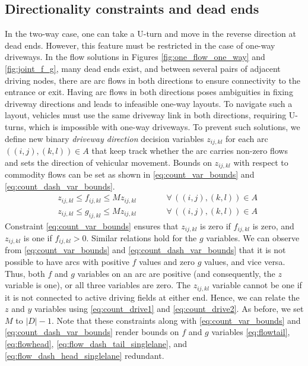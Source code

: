 \documentclass[10pt]{article}
\newcommand{\flowvar}[4]{f_{#1#2,#3#4}}
\newcommand{\flowvardash}[4]{g_{#1#2,#3#4}}
\newcommand{\countvar}[4]{z_{#1#2,#3#4}}
\newcommand{\validdriveset}{D}
\newcommand{\gridarcset}{A}
\theoremstyle{definition}
\begin{document}
\subsection{Directionality constraints and dead ends}
\label{sec:dead_end}
In the two-way case, one can take a U-turn and move in the reverse direction at dead ends. However, this feature must be restricted in the case of one-way driveways. In the flow solutions in Figures \ref{fig:one_flow_one_way} and \ref{fig:joint_f_g}, many dead ends exist, and between several pairs of adjacent driving nodes, there are arc flows in both directions to ensure connectivity to the entrance or exit. Having arc flows in both directions poses ambiguities in fixing driveway directions and leads to infeasible one-way layouts. To navigate such a layout, vehicles must use the same driveway link in both directions, requiring U-turns, which is impossible with one-way driveways. To prevent such solutions, we define new binary \textit{driveway direction} decision variables $\countvar{i}{j}{k}{l}$ for each arc $((i,j),(k,l)) \in \gridarcset$ that keep track whether the arc carries non-zero flows and sets the direction of vehicular movement.
Bounds on $\countvar{i}{j}{k}{l}$ with respect to commodity flows can be set as shown in \eqref{eq:count_var_bounds} and \eqref{eq:count_dash_var_bounds}. 
\begin{align} 
    & \countvar{i}{j}{k}{l} \leq \flowvar{i}{j}{k}{l} \leq  M \countvar{i}{j}{k}{l} \qquad && \forall \, ((i,j), (k,l)) \in \gridarcset  \label{eq:count_var_bounds}\\
    & \countvar{i}{j}{k}{l} \leq \flowvardash{i}{j}{k}{l} \leq M \countvar{i}{j}{k}{l} \qquad && \forall \, ((i,j), (k,l)) \in \gridarcset   \label{eq:count_dash_var_bounds}     
\end{align}
Constraint \eqref{eq:count_var_bounds} ensures that $\countvar{i}{j}{k}{l}$ is zero if $\flowvar{i}{j}{k}{l}$ is zero, and $\countvar{i}{j}{k}{l}$ is one if $\flowvar{i}{j}{k}{l} > 0$. Similar relations hold for the $g$ variables. We can observe from \eqref{eq:count_var_bounds} and \eqref{eq:count_dash_var_bounds} that it is not possible to have arcs with positive $f$ values and zero $g$ values, and vice versa. Thus, both $f$ and $g$ variables on an arc are positive (and consequently, the $z$ variable is one), or all three variables are zero. The $\countvar{i}{j}{k}{l}$ variable cannot be one if it is not connected to active driving fields at either end. Hence, we can relate the $z$ and $y$ variables using \eqref{eq:count_drive1} and \eqref{eq:count_drive2}. As before, we set $M$ to $|\validdriveset|-1$. Note that these constraints along with \eqref{eq:count_var_bounds} and \eqref{eq:count_dash_var_bounds} render bounds on $f$ and $g$ variables \eqref{eq:flowtail}, \eqref{eq:flowhead}, \eqref{eq:flow_dash_tail_singlelane}, and \eqref{eq:flow_dash_head_singlelane} redundant. 
\end{document}
